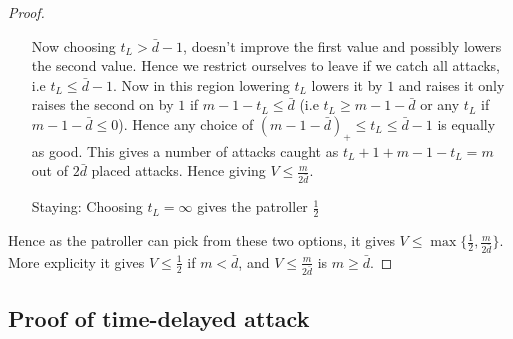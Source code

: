 \documentclass[a4paper,10pt]{article}
\newcommand{\pospart}[1]{\left( #1 \right)_{+}}
\theoremstyle{definition}
\theoremstyle{definition}
\theoremstyle{remark}
\theoremstyle{definition}
\begin{document}
\begin{proof}
\begin{itemize}
Now choosing $t_{L} > \bar{d}-1$, doesn't improve the first value and possibly lowers the second value. Hence we restrict ourselves to leave if we catch all attacks, i.e $t_{L} \leq \bar{d}-1$. Now in this region lowering $t_{L}$ lowers it by $1$ and raises it only raises the second on by $1$ if $m-1-t_{L} \leq \bar{d}$ (i.e $t_{L} \geq m-1-\bar{d}$ or any $t_{L}$ if $m-1-\bar{d} \leq 0$). Hence any choice of $\pospart{m-1-\bar{d}} \leq t_{L} \leq \bar{d}-1$ is equally as good. This gives a number of attacks caught as $t_{L}+1+m-1-t_{L}=m$ out of $2\bar{d}$ placed attacks. Hence giving $V \leq \frac{m}{2\bar{d}}$.

\item[Staying:]Choosing $t_{L}=\infty$ gives the patroller $\frac{1}{2}$
\end{itemize}

Hence as the patroller can pick from these two options, it gives $V \leq \max\{\frac{1}{2} , \frac{m}{2\bar{d}} \}$. More explicity it gives $V \leq \frac{1}{2}$ if $m < \bar{d}$, and $V \leq \frac{m}{2\bar{d}}$ is $m \geq \bar{d}$.
\end{proof}

\subsection{Proof of time-delayed attack}
\label{Appendix:Proof of time-delayed attack}
\end{document}
